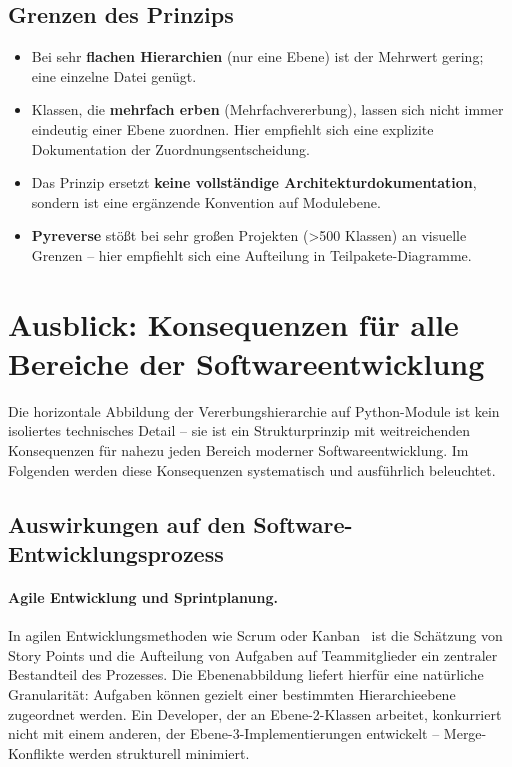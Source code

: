 ﻿\documentclass[a4paper,12pt]{article}
\begin{document}
\subsection{Grenzen des Prinzips}

\begin{itemize}[leftmargin=*]
	\item Bei sehr \textbf{flachen Hierarchien} (nur eine Ebene) ist der Mehrwert
	gering; eine einzelne Datei genügt.
	\item Klassen, die \textbf{mehrfach erben} (Mehrfachvererbung), lassen sich
	nicht immer eindeutig einer Ebene zuordnen. Hier empfiehlt sich eine
	explizite Dokumentation der Zuordnungsentscheidung.
	\item Das Prinzip ersetzt \textbf{keine vollständige Architekturdokumentation},
	sondern ist eine ergänzende Konvention auf Modulebene.
	\item \textbf{Pyreverse} stößt bei sehr großen Projekten (>500 Klassen) an
	visuelle Grenzen -- hier empfiehlt sich eine Aufteilung in
	Teilpakete-Diagramme.
\end{itemize}

\section{Ausblick: Konsequenzen für alle Bereiche der Softwareentwicklung}
\label{sec:ausblick}

Die horizontale Abbildung der Vererbungshierarchie auf Python-Module ist kein
isoliertes technisches Detail -- sie ist ein Strukturprinzip mit weitreichenden
Konsequenzen für nahezu jeden Bereich moderner Softwareentwicklung. Im Folgenden
werden diese Konsequenzen systematisch und ausführlich beleuchtet.

\subsection{Auswirkungen auf den Software-Entwicklungsprozess}

\paragraph{Agile Entwicklung und Sprintplanung.}
In agilen Entwicklungsmethoden wie Scrum oder Kanban~\cite{sutherland2014} ist
die Schätzung von Story Points und die Aufteilung von Aufgaben auf Teammitglieder
ein zentraler Bestandteil des Prozesses. Die Ebenenabbildung liefert hierfür
eine natürliche Granularität: Aufgaben können gezielt einer bestimmten
Hierarchieebene zugeordnet werden. Ein Developer, der an Ebene-2-Klassen
arbeitet, konkurriert nicht mit einem anderen, der Ebene-3-Implementierungen
entwickelt -- Merge-Konflikte werden strukturell minimiert.
\end{document}
